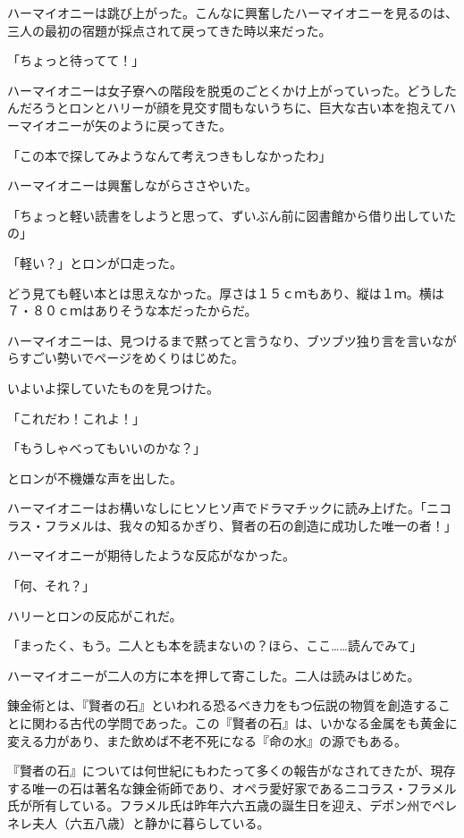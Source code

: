 \documentclass[10pt,a4paper]{article}
\begin{document}
\begin{CJK}{UTF8}{min}
ハーマイオニーは跳び上がった。こんなに興奮したハーマイオニーを見るのは、三人の最初の宿題が採点されて戻ってきた時以来だった。

「ちょっと待ってて！」

ハーマイオニーは女子寮への階段を脱兎のごとくかけ上がっていった。どうしたんだろうとロンとハリーが顔を見交す間もないうちに、巨大な古い本を抱えてハーマイオニーが矢のように戻ってきた。

「この本で探してみようなんて考えつきもしなかったわ」

ハーマイオニーは興奮しながらささやいた。

「ちょっと軽い読書をしようと思って、ずいぶん前に図書館から借り出していたの」

「軽い？」とロンが口走った。

どう見ても軽い本とは思えなかった。厚さは１５ｃｍもあり、縦は１ｍ。横は７・８０ｃｍはありそうな本だったからだ。

ハーマイオニーは、見つけるまで黙ってと言うなり、ブツブツ独り言を言いながらすごい勢いでページをめくりはじめた。

いよいよ探していたものを見つけた。

「これだわ！これよ！」

「もうしゃべってもいいのかな？」

とロンが不機嫌な声を出した。

ハーマイオニーはお構いなしにヒソヒソ声でドラマチックに読み上げた。「ニコラス・フラメルは、我々の知るかぎり、賢者の石の創造に成功した唯一の者！」

ハーマイオニーが期待したような反応がなかった。

「何、それ？」

ハリーとロンの反応がこれだ。

「まったく、もう。二人とも本を読まないの？ほら、ここ……読んでみて」

ハーマイオニーが二人の方に本を押して寄こした。二人は読みはじめた。



錬金術とは、『賢者の石』といわれる恐るべき力をもつ伝説の物質を創造することに関わる古代の学問であった。この『賢者の石』は、いかなる金属をも黄金に変える力があり、また飲めば不老不死になる『命の水』の源でもある。

『賢者の石』については何世紀にもわたって多くの報告がなされてきたが、現存する唯一の石は著名な錬金術師であり、オペラ愛好家であるニコラス・フラメル氏が所有している。フラメル氏は昨年六六五歳の誕生日を迎え、デポン州でペレネレ夫人（六五八歳）と静かに暮らしている。




\end{CJK}
\end{document}
